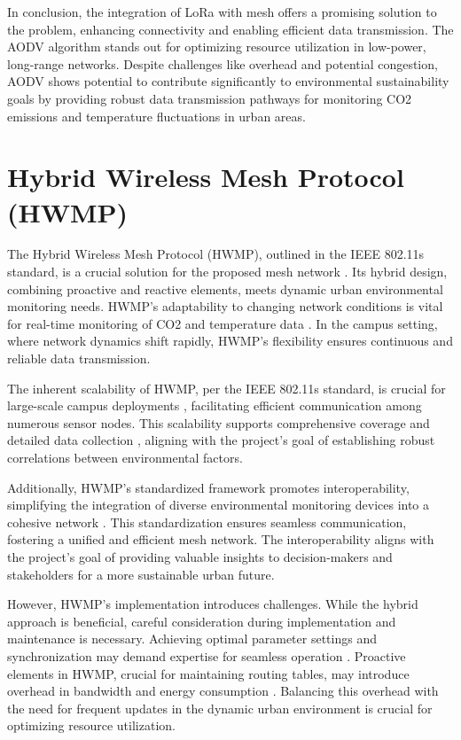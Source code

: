 In conclusion, the integration of LoRa with mesh offers a promising solution to the problem, enhancing connectivity and enabling efficient data transmission. The AODV algorithm stands out for optimizing resource utilization in low-power, long-range networks. Despite challenges like overhead and potential congestion, AODV shows potential to contribute significantly to environmental sustainability goals by providing robust data transmission pathways for monitoring CO2 emissions and temperature fluctuations in urban areas.

\section*{Hybrid Wireless Mesh Protocol (HWMP)}\label{sec:lit_review}

The Hybrid Wireless Mesh Protocol (HWMP), outlined in the IEEE 802.11s standard, is a crucial solution for the proposed mesh network \cite{Yang_Ma_Miao_2009}. Its hybrid design, combining proactive and reactive elements, meets dynamic urban environmental monitoring needs. HWMP's adaptability to changing network conditions is vital for real-time monitoring of CO2 and temperature data \cite{4428721}. In the campus setting, where network dynamics shift rapidly, HWMP's flexibility ensures continuous and reliable data transmission. 

The inherent scalability of HWMP, per the IEEE 802.11s standard, is crucial for large-scale campus deployments \cite{5409759}, facilitating efficient communication among numerous sensor nodes. This scalability supports comprehensive coverage and detailed data collection \cite{SFH2012}, aligning with the project's goal of establishing robust correlations between environmental factors. 

Additionally, HWMP's standardized framework promotes interoperability, simplifying the integration of diverse environmental monitoring devices into a cohesive network \cite{Whye_Lee_Lam_Yoo_2013}. This standardization ensures seamless communication, fostering a unified and efficient mesh network. The interoperability aligns with the project's goal of providing valuable insights to decision-makers and stakeholders for a more sustainable urban future. 

However, HWMP's implementation introduces challenges. While the hybrid approach is beneficial, careful consideration during implementation and maintenance is necessary. Achieving optimal parameter settings and synchronization may demand expertise for seamless operation \cite{Mishra_Kumar_Raghuvanshi_2023}. Proactive elements in HWMP, crucial for maintaining routing tables, may introduce overhead in bandwidth and energy consumption \cite{nmk2013}. Balancing this overhead with the need for frequent updates in the dynamic urban environment is crucial for optimizing resource utilization.

